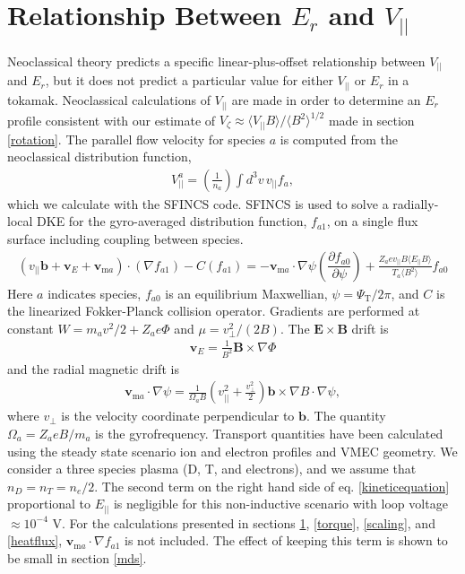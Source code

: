 \documentclass[aip, pop, preprint]{revtex4-1}
\numberwithin{figure}{section}
\numberwithin{equation}{section}
\newcommand{\partder}[2]{\dfrac{\partial  #1}{\partial  #2}} %
\begin{document}
\FloatBarrier

\section{Relationship Between $E_r$ and $V_{||}$}\label{Erandv}
Neoclassical theory predicts a specific linear-plus-offset relationship between $V_{||}$ and $E_r$, but it does not predict a particular value for either $V_{||}$ or $E_r$ in a tokamak. Neoclassical calculations of $V_{||}$ are made in order to determine an $E_r$ profile consistent with our estimate of $V_{\zeta} \approx \langle V_{||} B \rangle/\langle B^2 \rangle^{1/2}$ made in section \ref{rotation}. The parallel flow velocity for species $a$ is computed from the neoclassical distribution function,
\begin{gather}
V^a_{||} = \left(\frac{1}{n_a}\right) \int d^3 v \, v_{||} f_a,
\label{eq:parallelflow}
\end{gather}
which we calculate with the SFINCS \cite{Landreman2014} code. SFINCS is used to solve a radially-local DKE for the gyro-averaged distribution function, $f_{a1}$, on a single flux surface including coupling between species. 
\begin{gather}
( v_{||} \bm{b} + \bm{v}_E + \bm{v}_{\text{m}a}) \cdot (\nabla f_{a1})  - C(f_{a1}) = - \bm{v}_{\text{m}a} \cdot \nabla \psi \left( \partder{f_{a0}}{\psi} \right) + \frac{Z_a e v_{||} B \langle E_{||} B \rangle}{T_a \langle B^2 \rangle } f_{a0}
\label{kineticequation}
\end{gather} 
\hspace{-1mm}
Here $a$ indicates species, $f_{a0}$ is an equilibrium Maxwellian, $\psi = \Psi_{\text{T}}/2\pi$, and $C$ is the linearized Fokker-Planck collision operator. Gradients are performed at constant $W = m_a v^2/2 + Z_a e \Phi$ and $\mu = v_{\perp}^2/(2B)$. The $\bm{E} \times \bm{B}$ drift is 
\begin{gather}
\bm{v}_E = \frac{1}{B^2} \bm{B} \times \nabla \Phi
\end{gather} 
and the radial magnetic drift is
\begin{gather}
\bm{v}_{\text{m}a} \cdot \nabla \psi = \frac{1}{\Omega_a B} \left(v_{||}^2 + \frac{v_{\perp}^2}{2} \right) \bm{b} \times \nabla B \cdot \nabla \psi,
\label{magneticdrift}
\end{gather} 
where $v_{\perp}$ is the velocity coordinate perpendicular to $\bm{b}$. The quantity $\Omega_a = Z_aeB/m_a$ is the gyrofrequency. Transport quantities have been calculated using the steady state scenario ion and electron profiles and VMEC geometry. We consider a three species plasma (D, T, and electrons), and we assume that $n_D = n_T = n_e/2$. The second term on the right hand side of eq. \ref{kineticequation} proportional to $E_{||}$ is negligible for this non-inductive scenario with loop voltage $ \approx 10^{-4}$ V. For the calculations presented in sections \ref{Erandv}, \ref{torque}, \ref{scaling}, and \ref{heatflux}, $\bm{v}_{\text{m}a} \cdot \nabla f_{a1}$ is not included. The effect of keeping this term is shown to be small in section \ref{mds}.
\end{document}
